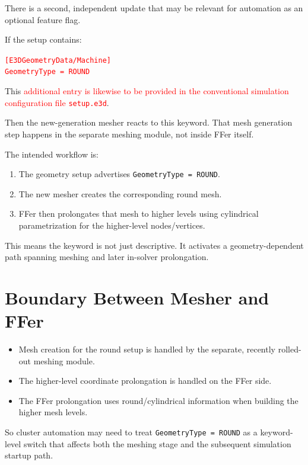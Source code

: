 \documentclass[11pt,a4paper]{article}
\begin{document}
There is a second, independent update that may be relevant for automation as an optional feature flag.

If the setup contains:

\begin{flushleft}
\textcolor{red}{\texttt{[E3DGeometryData/Machine]}}\\
\textcolor{red}{\texttt{GeometryType = ROUND}}
\end{flushleft}

This \textcolor{red}{additional entry is likewise to be provided in the conventional simulation
configuration file \texttt{setup.e3d}}.

Then the new-generation mesher reacts to this keyword. That mesh generation step happens in the separate meshing
module, not inside FFer itself.

The intended workflow is:

\begin{enumerate}[leftmargin=*]
  \item The geometry setup advertises \texttt{GeometryType = ROUND}.
  \item The new mesher creates the corresponding round mesh.
  \item FFer then prolongates that mesh to higher levels using cylindrical parametrization for the higher-level
        nodes/vertices.
\end{enumerate}

This means the keyword is not just descriptive. It activates a geometry-dependent path spanning meshing and later
in-solver prolongation.

\section*{Boundary Between Mesher and FFer}

\begin{itemize}[leftmargin=*]
  \item Mesh creation for the round setup is handled by the separate, recently rolled-out meshing module.
  \item The higher-level coordinate prolongation is handled on the FFer side.
  \item The FFer prolongation uses round/cylindrical information when building the higher mesh levels.
\end{itemize}

So cluster automation may need to treat \texttt{GeometryType = ROUND} as a keyword-level switch that affects both
the meshing stage and the subsequent simulation startup path.
\end{document}
